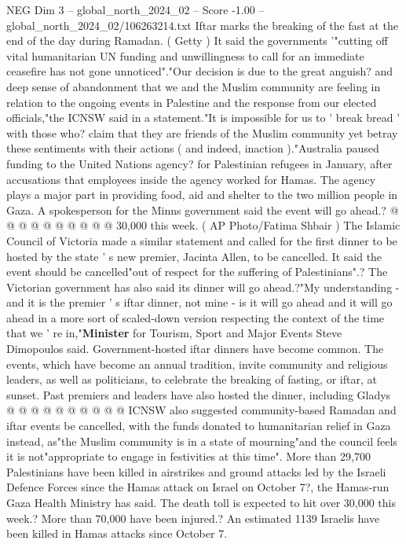 \begin{textsample}{NEG Dim 3 – global\_north\_2024\_02 – Score -1.00 – global\_north\_2024\_02/106263214.txt}  \label{ex:f3_neg_201}
Iftar marks the breaking of the fast at the end of the day during Ramadan. ( Getty ) It said the governments '"cutting off vital humanitarian UN funding and unwillingness to call for an immediate ceasefire has not gone unnoticed"."Our decision is due to the great anguish? and deep sense of abandonment that we and the Muslim community are feeling in relation to the ongoing events in Palestine and the response from our elected officials,"the ICNSW said in a statement."It is impossible for us to ' break bread ' with those who? claim that they are friends of the Muslim community yet betray these sentiments with their actions ( and indeed, inaction )."Australia paused funding to the United Nations agency? for Palestinian refugees in January, after accusations that employees inside the agency worked for Hamas.
The agency plays a major part in providing food, aid and shelter to the two million people in Gaza.
A spokesperson for the Minns government said the event will go ahead.? @ @ @ @ @ @ @ @ @ @ 30,000 this week. ( AP Photo/Fatima Shbair ) The Islamic Council of Victoria made a similar statement and called for the first dinner to be hosted by the state ' s new premier, Jacinta Allen, to be cancelled.
It said the event should be cancelled"out of respect for the suffering of Palestinians".?
The Victorian government has also said its dinner will go ahead.?"My understanding - and it is the premier ' s iftar dinner, not mine - is it will go ahead and it will go ahead in a more sort of scaled-down version respecting the context of the time that we ' re in,"\textbf{Minister} for Tourism, Sport and Major Events Steve Dimopoulos said.
Government-hosted iftar dinners have become common.
The events, which have become an annual tradition, invite community and religious leaders, as well as politicians, to celebrate the breaking of fasting, or iftar, at sunset.
Past premiers and leaders have also hosted the dinner, including Gladys @ @ @ @ @ @ @ @ @ @ ICNSW also suggested community-based Ramadan and iftar events be cancelled, with the funds donated to humanitarian relief in Gaza instead, as"the Muslim community is in a state of mourning"and the council feels it is not"appropriate to engage in festivities at this time".
More than 29,700 Palestinians have been killed in airstrikes and ground attacks led by the Israeli Defence Forces since the Hamas attack on Israel on October 7?, the Hamas-run Gaza Health Ministry has said.
The death toll is expected to hit over 30,000 this week.?
More than 70,000 have been injured.?
An estimated 1139 Israelis have been killed in Hamas attacks since October 7.

\end{textsample}
